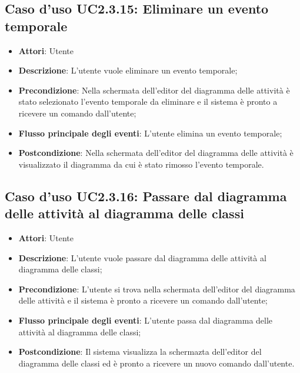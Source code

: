 \documentclass[../AnalisiDeiRequisiti.tex]{subfiles}
\begin{document}
					\subsection{Caso d'uso UC2.3.15: Eliminare un evento temporale}
					\begin{itemize}
						\item \textbf{Attori}: Utente
						\item \textbf{Descrizione}: L'utente vuole eliminare un evento temporale;
						\item \textbf{Precondizione}: Nella schermata dell'editor del diagramma delle attività è stato selezionato l'evento temporale da eliminare e il sistema è pronto a ricevere un comando dall'utente;
						\item \textbf{Flusso principale degli eventi}: L'utente elimina un evento temporale;
						\item \textbf{Postcondizione}: Nella schermata dell'editor del diagramma delle attività è visualizzato il diagramma da cui è stato rimosso l'evento temporale.
					\end{itemize}
					\subsection{Caso d'uso UC2.3.16: Passare dal diagramma delle attività al diagramma delle classi}
					\begin{itemize}
						\item \textbf{Attori}: Utente
						\item \textbf{Descrizione}: L'utente vuole passare dal diagramma delle attività al diagramma delle classi;
						\item \textbf{Precondizione}: L'utente si trova nella schermata dell'editor del diagramma delle attività e il sistema è pronto a ricevere un comando dall'utente;
						\item \textbf{Flusso principale degli eventi}: L'utente passa dal diagramma delle attività al diagramma delle classi;
						\item \textbf{Postcondizione}: Il sistema visualizza la schermazta dell'editor del diagramma delle classi ed è pronto a ricevere un nuovo comando dall'utente.
					\end{itemize}
\end{document}
